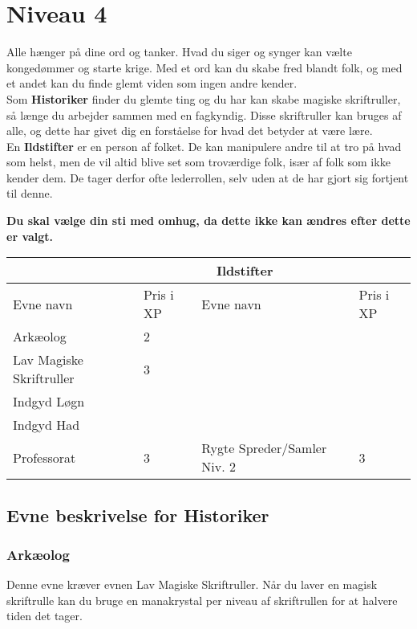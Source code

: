 \chapter*{Niveau 4}
Alle hænger på dine ord og tanker. Hvad du siger og synger kan vælte kongedømmer og starte krige. Med et ord kan du skabe fred blandt folk, og med et andet kan du finde glemt viden som ingen andre kender.\\
Som \textbf{Historiker} finder du glemte ting og du har kan skabe magiske skriftruller, så længe du arbejder sammen med en fagkyndig. Disse skriftruller kan bruges af alle, og dette har givet dig en forståelse for hvad det betyder at være lære.\\
En \textbf{Ildstifter} er en person af folket. De kan manipulere andre til at tro på hvad som helst, men de vil altid blive set som troværdige folk, især af folk som ikke kender dem. De tager derfor ofte lederrollen, selv uden at de har gjort sig fortjent til denne.

\textbf{Du skal vælge din sti med omhug, da dette ikke kan ændres efter dette er valgt.}\\


\begin{tabular}{|p{}|p{}|p{}|p{}|}
\hline
\rowcolor{cerulean!80}
 \multicolumn{2}{|c|}{ Historiker } & \multicolumn{2}{|c|}{ Ildstifter }\\
\hline
\rowcolor{cerulean!40}
    Evne navn & Pris i XP & Evne navn & Pris i XP\\ \hline
    Arkæolog & 2 &  & \\\hline
    Lav Magiske Skriftruller & 3 & & \\\hline
    Indgyd Løgn\\
    Indgyd Had\\
    Professorat & 3 & Rygte Spreder/Samler Niv. 2& 3\\\hline
\end{tabular}

\section*{Evne beskrivelse for Historiker}

\subsection*{Arkæolog}
Denne evne kræver evnen Lav Magiske Skriftruller. Når du laver en magisk skriftrulle kan du bruge en manakrystal per niveau af skriftrullen for at halvere tiden det tager. 


